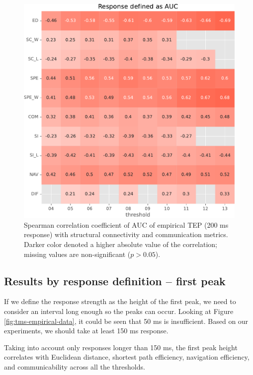 \begin{figure}
    \centering
    \includegraphics[width=\textwidth]{images/nootebook_generated/pytepfit_results/empirical/200/not_over_threshold_nan/Response defined as AUC.pdf}
    \caption[TEPs AUC (200 ms) correlations]{Spearman correlation coefficient of AUC of empirical TEP (200 ms response) with structural connectivity and communication metrics. Darker color denoted a higher absolute value of the correlation; missing values are non-significant ($p>0.05$).}
    \label{fig:tms_auc_200}
\end{figure}

\subsection{Results by response definition -- first peak}

If we define the response strength as the height of the first peak, we need to consider an interval long enough so the peaks can occur. Looking at Figure \ref{fig:tms-empirical-data}, it could be seen that 50 ms is insufficient. Based on our experiments, we should take at least 150 ms response. 

Taking into account only responses longer than 150 ms, the first peak height correlates with Euclidean distance, shortest path efficiency, navigation efficiency, and communicability across all the thresholds. 

